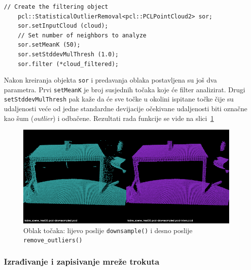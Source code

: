 \begin{lstlisting}[label=lstUklanjanje, caption={Dio izvornog koda 
iz funkcije \texttt{remove\_outliers()} }]
    // Create the filtering object
    pcl::StatisticalOutlierRemoval<pcl::PCLPointCloud2> sor;
    sor.setInputCloud (cloud);
    // Set number of neighbors to analyze
    sor.setMeanK (50);
    sor.setStddevMulThresh (1.0);
    sor.filter (*cloud_filtered);
\end{lstlisting}

Nakon kreiranja objekta \texttt{sor} i predavanja oblaka postavljena su
još dva parametra. Prvi \texttt{setMeanK} je broj susjednih točaka koje
će filter analizirat. Drugi \texttt{setStddevMulThresh} pak kaže da će
sve točke u okolini ispitane točke čije su udaljenosti veće od jedne
standardne devijacije očekivane udaljenosti biti označne kao šum
(\textit{outlier}) i odbačene. Rezultati rada funkcije se vide na
slici~\ref{fig:tablescene-outliers}

\begin{figure}[h]
\centering
\includegraphics[scale=0.5]{figures/tablescene-remove-outliers-example.png}
\caption{Oblak točaka: lijevo poslije \texttt{downsample()} i desno poslije
\texttt{remove\_outliers()} }
\label{fig:tablescene-outliers}
\end{figure}


\newpage
\subsubsection{Izrađivanje i zapisivanje mreže trokuta} %
\label{ssub:Izradivanje i zapisivanje mreže trokuta}

